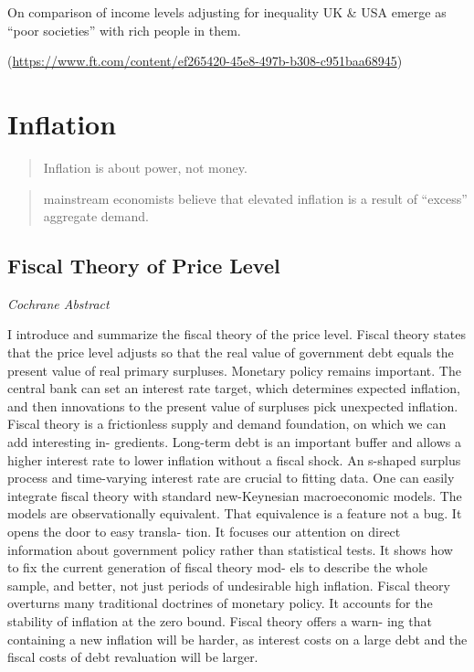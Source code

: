 \documentclass[
]{book}
\begin{document}
On comparison of income levels adjusting for inequality
UK \& USA emerge as ``poor societies'' with rich people in them.

\citep[ (2022) FT (paywall)]{jburnmurdoch}(\url{https://www.ft.com/content/ef265420-45e8-497b-b308-c951baa68945})

\hypertarget{inflation-1}{%
\chapter{Inflation}\label{inflation-1}}

\begin{quote}
Inflation is about power, not money.
\end{quote}

\begin{quote}
mainstream economists believe that elevated inflation is a result of ``excess'' aggregate demand.
\end{quote}

\hypertarget{fiscal-theory-of-price-level}{%
\section{Fiscal Theory of Price Level}\label{fiscal-theory-of-price-level}}

\emph{Cochrane Abstract}

I introduce and summarize the fiscal theory of the price level. Fiscal theory states
that the price level adjusts so that the real value of government debt equals the present
value of real primary surpluses. Monetary policy remains important. The central
bank can set an interest rate target, which determines expected inflation, and then
innovations to the present value of surpluses pick unexpected inflation. Fiscal theory
is a frictionless supply and demand foundation, on which we can add interesting in-
gredients. Long-term debt is an important buffer and allows a higher interest rate to
lower inflation without a fiscal shock. An s-shaped surplus process and time-varying
interest rate are crucial to fitting data. One can easily integrate fiscal theory with
standard new-Keynesian macroeconomic models. The models are observationally
equivalent. That equivalence is a feature not a bug. It opens the door to easy transla-
tion. It focuses our attention on direct information about government policy rather
than statistical tests. It shows how to fix the current generation of fiscal theory mod-
els to describe the whole sample, and better, not just periods of undesirable high
inflation. Fiscal theory overturns many traditional doctrines of monetary policy. It
accounts for the stability of inflation at the zero bound. Fiscal theory offers a warn-
ing that containing a new inflation will be harder, as interest costs on a large debt and
the fiscal costs of debt revaluation will be larger.
\end{document}
